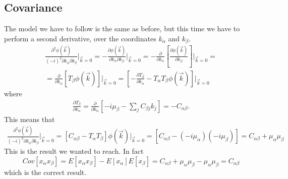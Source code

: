 \documentclass[a4paper,11pt,fleqn]{article}
\begin{document}
\subsection{Covariance}
The model we have to follow is the same as before, but this time we have to 
perform a second derivative, over the coordinates $k_{\alpha}$ and $k_{\beta}$.
\begin{gather*}
    \frac{\partial^2\phi(\vec{k})}{(-i)^2\partial k_{\alpha}\partial k_{\beta}}\Big|_{\vec{k}=0} = -\frac{\partial \phi (\vec{k})}{\partial k_{\alpha}\partial k_{\beta}} \Big|_{\vec{k}=0}= -\frac{\partial}{\partial k_{\alpha}}\left[\frac{\partial \phi(\vec{k})}{\partial k_{\beta}}\right]\Big|_{\vec{k}=0} =\\
    = \frac{\partial}{\partial k_{\alpha}}\left[T_{\beta}\phi(\vec{k})\right]\Big|_{\vec{k}=0} = \left[-\frac{\partial T_{\beta}}{\partial k_{\alpha}} -T_{\alpha}T_{\beta}\phi(\vec{k})\right]\Big|_{\vec{k}=0}
\end{gather*}
where
\begin{gather*}
    \frac{\partial T_{\beta}}{\partial k_{\alpha}} = \frac{\partial}{\partial k_{\alpha}}\left[-i\mu_{\beta}-\sum_j C_{\beta j}k_j\right] = -C_{\alpha \beta}.
\end{gather*}
This means that
\begin{gather*}
    \frac{\partial^2\phi(\vec{k})}{(-i)^2\partial k_{\alpha}\partial k_{\beta}}\Big|_{\vec{k}=0} = [C_{\alpha \beta}-T_{\alpha}T_{\beta}]\phi(\vec{k})\Big|_{\vec{k}=0} = [C_{\alpha \beta}- (-i\mu_{\alpha})(-i\mu_{\beta})] = C_{\alpha \beta} +\mu_{\alpha}\mu_{\beta}
\end{gather*}
This is the result we wanted to reach. In fact 
\begin{equation}
    Cov[x_{\alpha}x_{\beta}] = E[x_{\alpha}x_{\beta}] - E[x_{\alpha}]E[x_{\beta}] = C_{\alpha \beta} +\mu_{\alpha}\mu_{\beta} - \mu_{\alpha}\mu_{\beta} = C_{\alpha \beta}
\end{equation}
which is the correct result. 






\end{document}
